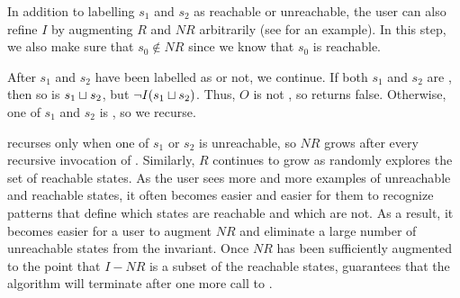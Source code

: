 In addition to labelling $s_1$ and $s_2$ as reachable or unreachable, the user
can also refine $I$ by augmenting $R$ and $NR$ arbitrarily (see
 for an example). In this step, we also make
sure that $s_0 \notin NR$ since we know that $s_0$ is reachable.

After $s_1$ and $s_2$ have been labelled as \sTIreachable{} or not, we
continue. If both $s_1$ and $s_2$ are \sTIreachable{}, then so is $s_1 \sqcup
s_2$, but $\lnot I(s_1 \sqcup s_2)$. Thus, $O$ is not \sTIconfluent{}, so
\Helper{} returns false. Otherwise, one of $s_1$ and $s_2$ is
\sTIunreachable{}, so we recurse.

\Helper{} recurses only when one of $s_1$ or $s_2$ is unreachable, so $NR$
grows after every recursive invocation of \Helper{}. Similarly, $R$ continues
to grow as \Helper{} randomly explores the set of reachable states. As the user
sees more and more examples of unreachable and reachable states, it often becomes
easier and easier for them to recognize patterns that define which states are
reachable and which are not. As a result, it becomes easier for a user to
augment $NR$ and eliminate a large number of unreachable states from the
invariant. Once $NR$ has been sufficiently augmented to the point that $I - NR$
is a subset of the reachable states, 
guarantees that the algorithm will terminate after one more call to \IsIclosed.

